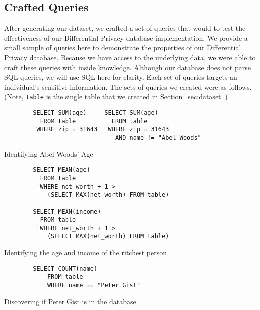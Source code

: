 \documentclass[conference,11pt]{IEEEtran}
\begin{document}
\subsection{Crafted Queries}\label{sec:crafted-queries}
After generating our dataset, we crafted a set of queries that would to test the
effectiveness of our Differential Privacy database implementation. We provide a
small sample of queries here to demonstrate the properties of our Differential
Privacy database. Because we have access to the underlying data, we were able to
craft these queries with inside knowledge. Although our database does not parse
SQL queries, we will use SQL here for clarity. Each set of queries targets an
individual's sensitive information. The sets of queries we created were as
follows. (Note, \texttt{table} is the single table that we created in
Section~\ref{sec:dataset}.)

\begin{listing}[H]
    \begin{verbatim}
        SELECT SUM(age)     SELECT SUM(age)
          FROM table          FROM table
         WHERE zip = 31643   WHERE zip = 31643
                               AND name != "Abel Woods"
    \end{verbatim}
    \caption{Identifying Abel Woods' Age}
    \label{qs:abel}
\end{listing}

\begin{listing}[H]
    \begin{verbatim}
        SELECT MEAN(age)
          FROM table
          WHERE net_worth + 1 >
            (SELECT MAX(net_worth) FROM table)

        SELECT MEAN(income)
          FROM table
          WHERE net_worth + 1 >
            (SELECT MAX(net_worth) FROM table)
    \end{verbatim}
    \caption{Identifying the age and income of the ritchest person}
    \label{qs:richest-person}
\end{listing}

\begin{listing}[H]
    \begin{verbatim}
        SELECT COUNT(name)
            FROM table
            WHERE name == "Peter Gist"
    \end{verbatim}
    \caption{Discovering if Peter Gist is in the database}
    \label{qs:peter}
\end{listing}

\end{document}
